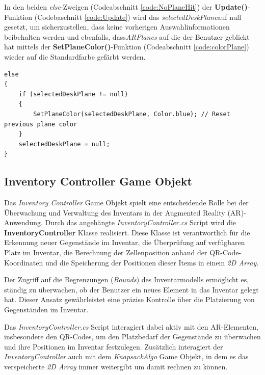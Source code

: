 In den beiden \textit{else}-Zweigen (Codeabschnitt \ref{code:NoPlaneHit}) der \textbf{Update()}-Funktion (Codebaschnitt \ref{code:Update})
wird das \textit{selectedDeskPlane}auf null gesetzt, um sicherzustellen, dass keine vorherigen Auswahlinformationen
beibehalten werden und ebenfalls, dass\textit{ARPlanes} auf die der Benutzer geblickt hat mittels der \textbf{SetPlaneColor()}-Funktion
(Codeabschnitt \ref{code:colorPlane}) wieder auf die Standardfarbe gefärbt werden.
\begin{lstlisting}[style=csharp, caption={Ausgewaehltes Plane und Farbe zurücksetzen}, label=code:NoPlaneHit]
else
{
    if (selectedDeskPlane != null)
    {
        SetPlaneColor(selectedDeskPlane, Color.blue); // Reset previous plane color
    }
    selectedDeskPlane = null;
}
\end{lstlisting}

\subsection{Inventory Controller Game Objekt}
Das \textit{Inventory Controller} Game Objekt spielt eine entscheidende Rolle bei der Überwachung und Verwaltung des
Inventars in der Augmented Reality (AR)-Anwendung. Durch das angehängte \textit{InventoryController.cs} Script wird die
\textbf{InventoryController} Klasse realisiert. Diese Klasse ist verantwortlich für die Erkennung neuer Gegenstände im
Inventar, die Überprüfung auf verfügbaren Platz im Inventar, die Berechnung der Zellenposition anhand der QR-Code-Koordinaten
und die Speicherung der Positionen dieser Items in einem \textit{2D Array}.

Der Zugriff auf die Begrenzungen (\textit{Bounds}) des Inventarmodells ermöglicht es, ständig zu überwachen, ob der
Benutzer ein neues Element in das Inventar gelegt hat. Dieser Ansatz gewährleistet eine präzise Kontrolle über die
Platzierung von Gegenständen im Inventar.

Das \textit{InventoryController.cs} Script interagiert dabei aktiv mit den AR-Elementen, insbesondere den QR-Codes, um
den Platzbedarf der Gegenstände zu überwachen und ihre Positionen im Inventar festzulegen. Zusätzlich interagiert der
\textit{InventoryController} auch mit dem \textit{KnapsackAlgo} Game Objekt, in dem es das verspeicherte \textit{2D Array}
immer weitergibt um damit rechnen zu können.\\

